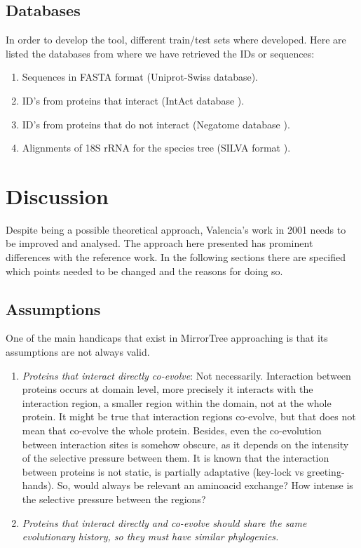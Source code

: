 \documentclass[11pt]{article}
\begin{document}
\subsection{Databases}
In order to develop the tool, different train/test sets where developed. Here are listed the databases from where we have retrieved the IDs or sequences:
\begin{enumerate}
\setlength{\itemsep}{1pt}
	\item Sequences in FASTA format (Uniprot-Swiss database).
	\item ID's from proteins that interact (IntAct database \cite{intact}).
	\item ID's from proteins that do not interact (Negatome database \cite{negatome}).
	\item Alignments of 18S rRNA for the species tree (SILVA format \cite{SILVA}).
\end{enumerate}

\section{Discussion}
Despite being a possible theoretical approach, Valencia's work in 2001\cite{Pazos2001} needs to be improved and analysed. The approach here presented has prominent differences with the reference work. In the following sections there are specified which points needed to be changed and the reasons for doing so.

\subsection{Assumptions}
One of the main handicaps that exist in MirrorTree approaching is that its assumptions are not always valid.
\begin{enumerate}
\setlength{\itemsep}{1pt}
	\item \textit{Proteins that interact directly co-evolve}: Not necessarily. Interaction between proteins occurs at domain level, more precisely it interacts with the interaction region, a smaller region within the domain, not at the whole protein. It might be true that interaction regions co-evolve, but that does not mean that co-evolve the whole protein. Besides, even the co-evolution between interaction sites is somehow obscure, as it depends on the intensity of the selective pressure between them. It is known that the interaction between proteins is not static, is partially adaptative (key-lock vs greeting-hands). So, would always be relevant an aminoacid exchange? How intense is the selective pressure between the regions?
	\item \textit{Proteins that interact directly and co-evolve should share the same evolutionary history, so they must have similar phylogenies.}
\end{enumerate}
\end{document}
